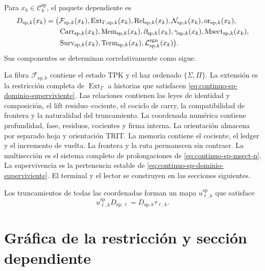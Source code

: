Para \(x_k\in\mathcal C_k^{\mathrm{sp}}\), el paquete dependiente es
\begin{equation}
\label{eq:continuo-sp-d13}
\begin{aligned}
 D_{\mathrm{sp},k}(x_k)=\bigl(&
 \mathcal F_{\mathrm{sp},k}(x_k),
 \operatorname{Ext}_{\Gamma,\mathrm{sp},k}(x_k),
 \operatorname{Rel}_{\mathrm{sp},k}(x_k),
 \mathcal N_{\mathrm{sp},k}(x_k),
 \operatorname{or}_{\mathrm{sp},k}(x_k),\\
 &\operatorname{Carr}_{\mathrm{sp},k}(x_k),
 \operatorname{Mem}_{\mathrm{sp},k}(x_k),
 \partial_{\mathrm{sp},k}(x_k),
 \gamma_{\mathrm{sp},k}(x_k),
 \operatorname{Msect}_{\mathrm{sp},k}(x_k),\\
 &\operatorname{Surv}_{\mathrm{sp},k}(x_k),
 \operatorname{Term}_{\mathrm{sp},k}(x_k),
 \mathcal L^{\rm sgn}_{\mathrm{sp},k}(x_k)\bigr).
\end{aligned}
\end{equation}
Sus componentes se determinan correlativamente como sigue.

La fibra \(\mathcal F_{\mathrm{sp},k}\) contiene el estado TPK y el haz
ordenado \(\{\Sigma,\Pi\}\). La extensión es la restricción completa de
\(\operatorname{Ext}_\Gamma\) a historias que satisfacen
\eqref{eq:continuo-sp-dominio-superviviente}. Las relaciones contienen las
leyes de identidad y composición, el lift residuo--cociente, el cociclo de
carry, la compatibilidad de frontera y la naturalidad del truncamiento. La
coordenada numérica contiene profundidad, fase, residuos, cocientes y firma
interna. La orientación almacena por separado hoja y orientación TRIT. La
memoria contiene el cociente, el ledger y el incremento de vuelta. La
frontera y la ruta permanecen sin contraer. La multisección es el sistema
completo de prolongaciones de \eqref{eq:continuo-sp-msect-n}. La
supervivencia es la pertenencia estable de
\eqref{eq:continuo-sp-dominio-superviviente}. El terminal y el lector se
construyen en las secciones siguientes.

Los truncamientos de todas las coordenadas forman un mapa
\(u^{\mathrm{sp}}_{\ell,k}\) que satisface
\begin{equation}
\label{eq:continuo-sp-d-naturalidad}
 u^{\mathrm{sp}}_{\ell,k}D_{\mathrm{sp},\ell}
 =D_{\mathrm{sp},k}\tau_{\ell,k}.
\end{equation}

\section{Gráfica de la restricción y sección dependiente}


